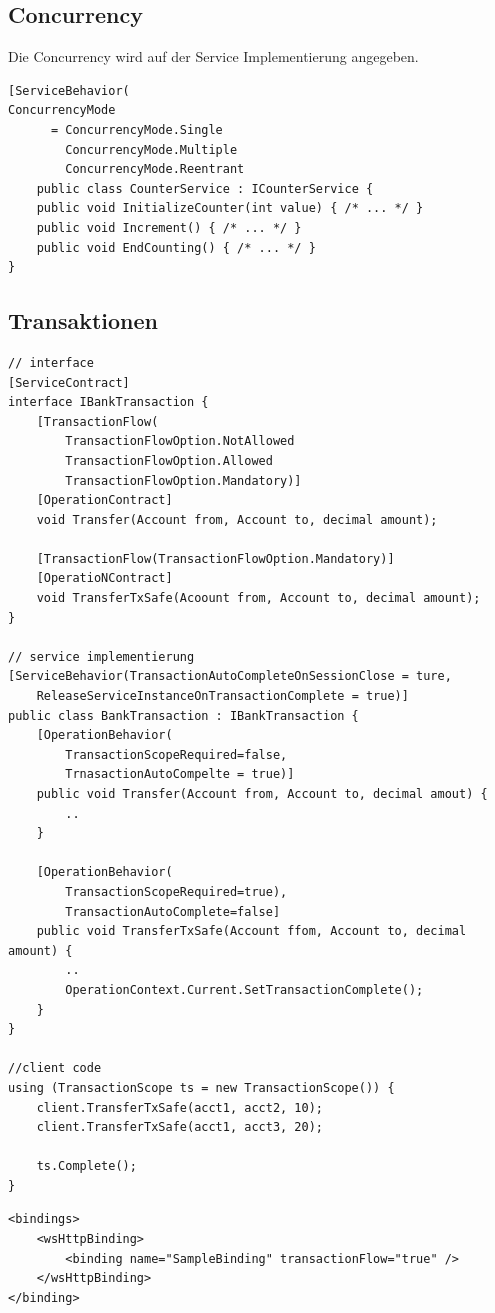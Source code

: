 \subsection{Concurrency}
Die Concurrency wird auf der Service Implementierung angegeben.
\begin{lstlisting}[caption=WCF Concurrency]
[ServiceBehavior(
ConcurrencyMode
	  = ConcurrencyMode.Single
		ConcurrencyMode.Multiple
		ConcurrencyMode.Reentrant
	public class CounterService : ICounterService {
	public void InitializeCounter(int value) { /* ... */ }
	public void Increment() { /* ... */ }
	public void EndCounting() { /* ... */ }
}
\end{lstlisting}

\subsection{Transaktionen}
\begin{lstlisting}
// interface
[ServiceContract] 
interface IBankTransaction {
	[TransactionFlow(
		TransactionFlowOption.NotAllowed
		TransactionFlowOption.Allowed
		TransactionFlowOption.Mandatory)]
	[OperationContract]
	void Transfer(Account from, Account to, decimal amount);
	
	[TransactionFlow(TransactionFlowOption.Mandatory)]
	[OperatioNContract]
	void TransferTxSafe(Acoount from, Account to, decimal amount);
}

// service implementierung
[ServiceBehavior(TransactionAutoCompleteOnSessionClose = ture,
	ReleaseServiceInstanceOnTransactionComplete = true)]
public class BankTransaction : IBankTransaction {
	[OperationBehavior(
		TransactionScopeRequired=false,
		TrnasactionAutoCompelte = true)]
	public void Transfer(Account from, Account to, decimal amout) {
		..
	}
	
	[OperationBehavior(
		TransactionScopeRequired=true),
		TransactionAutoComplete=false]
	public void TransferTxSafe(Account ffom, Account to, decimal amount) {
		..
		OperationContext.Current.SetTransactionComplete();
	}
}

//client code
using (TransactionScope ts = new TransactionScope()) {
	client.TransferTxSafe(acct1, acct2, 10);
	client.TransferTxSafe(acct1, acct3, 20);
	
	ts.Complete();
}
\end{lstlisting}

\begin{lstlisting}
<bindings>
	<wsHttpBinding>
		<binding name="SampleBinding" transactionFlow="true" />
	</wsHttpBinding>
</binding>
\end{lstlisting}

